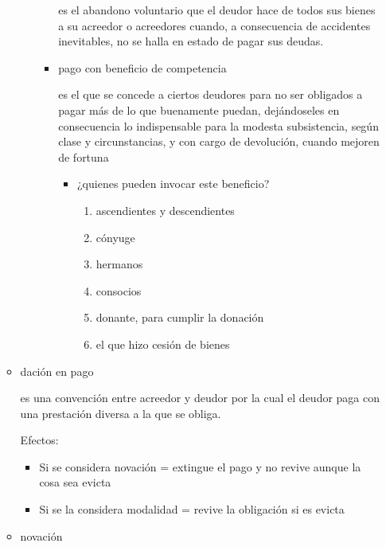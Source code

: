 \documentclass[]{article}
\providecommand{\tightlist}{%
  \setlength{\itemsep}{0pt}\setlength{\parskip}{0pt}}
\begin{document}
\begin{itemize}
\begin{itemize}
\begin{itemize}
\begin{itemize}
        es el abandono voluntario que el deudor hace de todos sus bienes
        a su acreedor o acreedores cuando, a consecuencia de accidentes
        inevitables, no se halla en estado de pagar sus deudas.
      \item
        pago con beneficio de competencia

        es el que se concede a ciertos deudores para no ser obligados a
        pagar más de lo que buenamente puedan, dejándoseles en
        consecuencia lo indispensable para la modesta subsistencia,
        según clase y circunstancias, y con cargo de devolución, cuando
        mejoren de fortuna

        \begin{itemize}
        \tightlist
        \item
          ¿quienes pueden invocar este beneficio?

          \begin{enumerate}
          \def\labelenumi{\arabic{enumi}.}
          \tightlist
          \item
            ascendientes y descendientes
          \item
            cónyuge
          \item
            hermanos
          \item
            consocios
          \item
            donante, para cumplir la donación
          \item
            el que hizo cesión de bienes
          \end{enumerate}
        \end{itemize}
      \end{itemize}
    \end{itemize}
  \item
    dación en pago

    es una convención entre acreedor y deudor por la cual el deudor paga
    con una prestación diversa a la que se obliga.

    Efectos:

    \begin{itemize}
    \tightlist
    \item
      Si se considera novación = extingue el pago y no revive aunque la
      cosa sea evicta
    \item
      Si se la considera modalidad = revive la obligación si es evicta
    \end{itemize}
  \item
    novación


\end{itemize}
\end{itemize}
\end{document}
